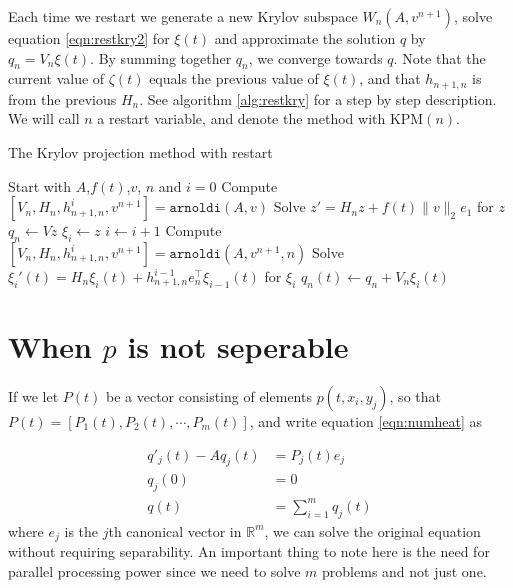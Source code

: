 Each time we restart we generate a new Krylov subspace $W_n(A,v^{n+1})$, solve equation \eqref{eqn:restkry2} for $\xi(t)$ and approximate the solution $q$ by $ q_n =  V_n\xi(t)$. By summing together $q_n$, we converge towards $q$. Note that the current value of $\zeta(t)$ equals the previous value of $\xi(t)$, and that $h_{n+1,n}$ is from the previous $H_n$. See algorithm \ref{alg:restkry} for a step by step description. We will call $n$ a restart variable, and denote the method with KPM$(n)$.
\begin{algorithm}
\begin{algorithmic} \caption{The Krylov projection method with restart} \label{alg:restkry} 
\STATE Start with $A$,$f(t)$,$v$, $n$ and $i = 0$
\STATE Compute $[V_n,H_n,h_{n+1,n}^i,v^{n+1}] = \texttt{arnoldi}(A,v)$
\STATE Solve $  z' = H_n z + f(t) \| v \|_2 e_1  $ for $z$
\STATE $ q_n \leftarrow  V z $
\STATE $\xi_i \leftarrow z$
    \STATE $i \leftarrow i + 1$
    \STATE Compute $[V_n,H_n,h_{n+1,n}^i,v^{n+1}] = \texttt{arnoldi}(A,v^{n+1},n)$
    \STATE Solve $ \xi_i'(t) = H_n \xi_i(t) + h_{n+1,n}^{i-1}e_n^\top \xi_{i-1}(t)  $ for $\xi_i$
    \STATE $ q_n(t) \leftarrow q_n + V_n \xi_i(t) $
\ENDWHILE
\end{algorithmic} 
\end{algorithm}

\section{When $p$ is not seperable} \label{sec:nonsep}
If we let $P(t)$ be a vector consisting of elements $p(t, x_i, y_j)$, so that $P(t) = [P_1(t),P_2(t),\cdots, P_m(t)]$, and write equation \eqref{eqn:numheat} as

\begin{equation}
\begin{aligned}
q'_j(t) -A q_j(t) &= P_j(t) e_j \\
q_j(0) &= 0\\
q(t) &= \sum \limits_{i = 1}^m q_j(t)
\end{aligned}
\end{equation}
where $e_j$ is the $j$th canonical vector in $\mathbb{R}^{m}$, we can solve the original equation without requiring separability. 
An important thing to note here is the need for parallel processing power since we need to solve $m$ problems and not just one.
